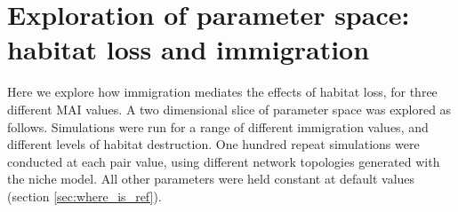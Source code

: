\begin{figure}[h!]
	\centering	
	\renewcommand{\thesubfigure}{}
	\setlength{\subfloatlabelskip}{0pt}

	\label{fig:rel_abun_fg_mai_51}
\end{figure}


\section{Exploration of parameter space: habitat loss and immigration}
\label{sec:heatmaps}

Here we explore how immigration mediates the effects of habitat loss, for three different MAI values. A two dimensional slice of parameter space was explored as follows. Simulations were run for a range of different immigration values, and different levels of habitat destruction. One hundred repeat simulations were conducted at each pair value, using different network topologies generated with the niche model. All other parameters were held constant at default values (section \ref{sec:where_is_ref}). 

